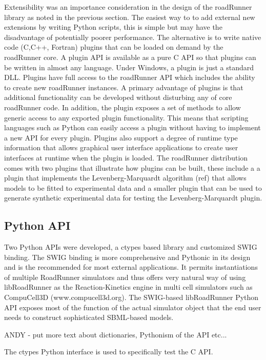 \documentclass{bioinfo}
\begin{document}
\begin{methods}
Extensibility was an importance consideration in the design of the roadRunner library as noted in the previous section. The easiest way to to add external new extensions by writing Python scripts, this is simple but may have the disadvantage of potentially poorer performance. The alternative is to write native code (C,C++, Fortran) plugins that can be loaded on demand by the roadRunner core. A plugin API is available as a pure C API so that plugins can be written in almost any language. Under Windows, a plugin is just a standard DLL. Plugins have full access to the roadRunner API which includes the ability to create new roadRunner instances. A primary advantage of plugins is that additional functionality can be developed without disturbing any of core roadRunner code. In addition, the plugin exposes a set of methods to allow generic access to any exported plugin functionality. This means that scripting languages such as Python can easily access a plugin without having to implement a new API for every plugin. Plugins also support a degree of runtime type information that allows graphical user interface applications to create user interfaces at runtime when the plugin is loaded. The roadRunner distribution comes with two plugins that illustrate how plugins can be built, these include a a plugin that implements the Levenberg-Marquardt algorithm (ref) that allows models to be fitted to experimental data and a smaller plugin that can be used to generate synthetic experimental data for testing the Levenberg-Marquardt plugin.


\subsection{Python API}

Two Python APIs were developed, a ctypes based library and customized SWIG binding. The SWIG binding is more comprehensive and Pythonic in its design and is the recommended for most external applications. It permits instantiations of multiple RoadRunner simulators and thus offers very natural way of using libRoadRunner as the Reaction-Kinetics engine in multi cell simulators such as CompuCell3D (www.compucell3d.org). The SWIG-based libRoadRunner Python API exposes most of the function of the actual simulator object that the end user needs to construct sophisticated SBML-based models.

ANDY - put more text about dictionaries, Pythonism of the API etc... 

The ctypes Python interface is used to specifically test the C API. 


\end{methods}
\end{document}
